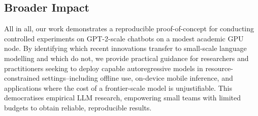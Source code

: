 \subsection{Broader Impact}

All in all, our work demonstrates a reproducible proof-of-concept for conducting controlled experiments on GPT-2-scale chatbots on a modest academic GPU node.
By identifying which recent innovations transfer to small-scale language modelling and which do not, we provide practical guidance for researchers and practitioners seeking to deploy capable autoregressive models in resource-constrained settings--including offline use, on-device mobile
inference, and applications where the cost of a frontier-scale model is unjustifiable. This democratises empirical LLM research, empowering small teams with limited budgets to obtain reliable, reproducible results.
